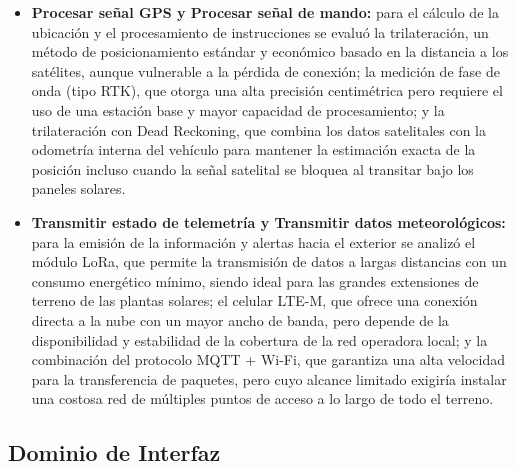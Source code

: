 \documentclass[../../General.tex]{subfiles}
\begin{document}
\begin{itemize}
	\item \textbf{Procesar señal GPS y Procesar señal de mando:} para el cálculo de la ubicación y el procesamiento de instrucciones se evaluó la trilateración, un método de posicionamiento estándar y económico basado en la distancia a los satélites, aunque vulnerable a la pérdida de conexión; la medición de fase de onda (tipo RTK), que otorga una alta precisión centimétrica pero requiere el uso de una estación base y mayor capacidad de procesamiento; y la trilateración con Dead Reckoning, que combina los datos satelitales con la odometría interna del vehículo para mantener la estimación exacta de la posición incluso cuando la señal satelital se bloquea al transitar bajo los paneles solares.
	
	\item \textbf{Transmitir estado de telemetría y Transmitir datos meteorológicos:} para la emisión de la información y alertas hacia el exterior se analizó el módulo LoRa, que permite la transmisión de datos a largas distancias con un consumo energético mínimo, siendo ideal para las grandes extensiones de terreno de las plantas solares; el celular LTE-M, que ofrece una conexión directa a la nube con un mayor ancho de banda, pero depende de la disponibilidad y estabilidad de la cobertura de la red operadora local; y la combinación del protocolo MQTT + Wi-Fi, que garantiza una alta velocidad para la transferencia de paquetes, pero cuyo alcance limitado exigiría instalar una costosa red de múltiples puntos de acceso a lo largo de todo el terreno.
\end{itemize}

\subsection{Dominio de Interfaz}
\end{document}
